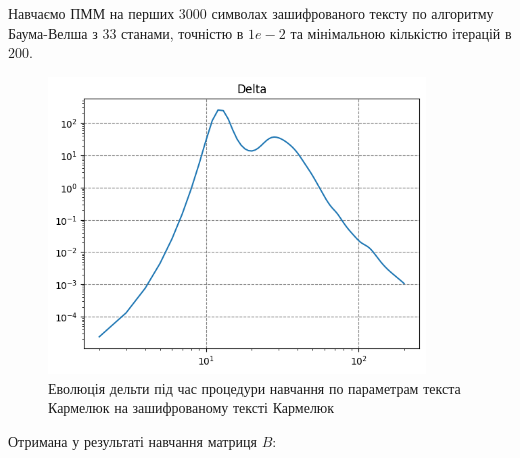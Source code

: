 \documentclass[12pt,a4paper]{article}
\begin{document}
Навчаємо ПММ на перших 3000 символах зашифрованого тексту
по алгоритму Баума-Велша з 33 станами, точністю в $1e-2$ та мінімальною
кількістю ітерацій в $200$.

\begin{figure}[h]
  \includegraphics[width=10cm]{../plots/delta_karmeluk_karmeluk.png}
  \centering
  \caption{Еволюція дельти під час процедури навчання по параметрам текста Кармелюк на зашифрованому тексті Кармелюк}
\end{figure}

Отримана у результаті навчання матриця $B$:
\end{document}
